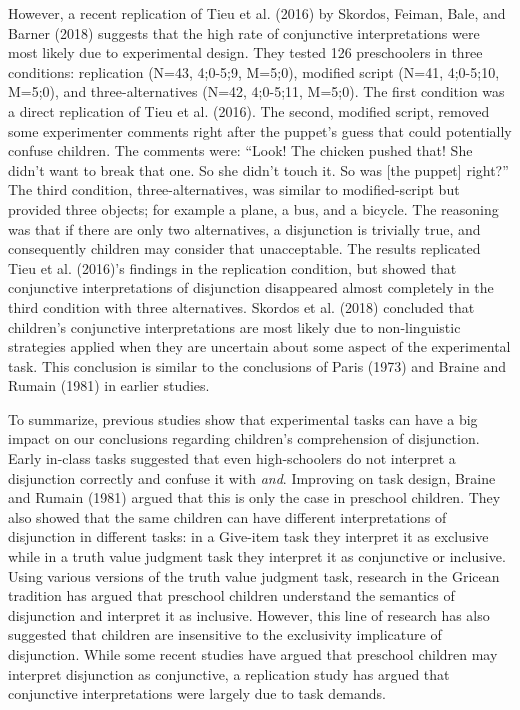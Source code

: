 \documentclass[floatsintext,man]{apa6}
\theoremstyle{definition}
\theoremstyle{definition}
\theoremstyle{definition}
\theoremstyle{remark}
\begin{document}
However, a recent replication of Tieu et al. (2016) by Skordos, Feiman,
Bale, and Barner (2018) suggests that the high rate of conjunctive
interpretations were most likely due to experimental design. They tested
126 preschoolers in three conditions: replication (N=43, 4;0-5;9,
M=5;0), modified script (N=41, 4;0-5;10, M=5;0), and three-alternatives
(N=42, 4;0-5;11, M=5;0). The first condition was a direct replication of
Tieu et al. (2016). The second, modified script, removed some
experimenter comments right after the puppet's guess that could
potentially confuse children. The comments were: \enquote{Look! The
chicken pushed that! She didn't want to break that one. So she didn't
touch it. So was {[}the puppet{]} right?} The third condition,
three-alternatives, was similar to modified-script but provided three
objects; for example a plane, a bus, and a bicycle. The reasoning was
that if there are only two alternatives, a disjunction is trivially
true, and consequently children may consider that unacceptable. The
results replicated Tieu et al. (2016)'s findings in the replication
condition, but showed that conjunctive interpretations of disjunction
disappeared almost completely in the third condition with three
alternatives. Skordos et al. (2018) concluded that children's
conjunctive interpretations are most likely due to non-linguistic
strategies applied when they are uncertain about some aspect of the
experimental task. This conclusion is similar to the conclusions of
Paris (1973) and Braine and Rumain (1981) in earlier studies.

To summarize, previous studies show that experimental tasks can have a
big impact on our conclusions regarding children's comprehension of
disjunction. Early in-class tasks suggested that even high-schoolers do
not interpret a disjunction correctly and confuse it with \emph{and}.
Improving on task design, Braine and Rumain (1981) argued that this is
only the case in preschool children. They also showed that the same
children can have different interpretations of disjunction in different
tasks: in a Give-item task they interpret it as exclusive while in a
truth value judgment task they interpret it as conjunctive or inclusive.
Using various versions of the truth value judgment task, research in the
Gricean tradition has argued that preschool children understand the
semantics of disjunction and interpret it as inclusive. However, this
line of research has also suggested that children are insensitive to the
exclusivity implicature of disjunction. While some recent studies have
argued that preschool children may interpret disjunction as conjunctive,
a replication study has argued that conjunctive interpretations were
largely due to task demands.
\end{document}
